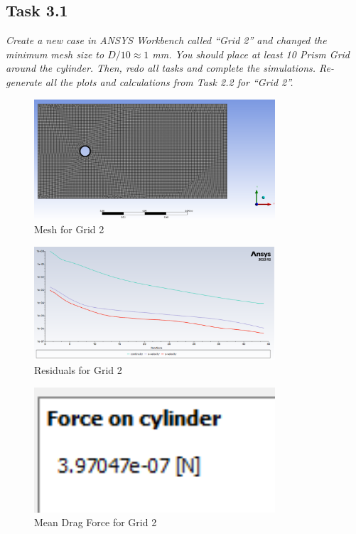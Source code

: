 \subsection*{Task 3.1}
\textit{Create a new case in ANSYS Workbench called “Grid 2” and changed the minimum mesh size to $D/10 \approx 1$ mm. You should place at least 10 Prism Grid around the cylinder. Then, redo all tasks and complete the simulations. Re-generate all the plots and calculations from Task 2.2 for “Grid 2”.}
\begin{figure}[H]
    \centering
    \includegraphics[width=0.8\textwidth]{Questions/Figures/mesh with grid 2.png}
    \caption{Mesh for Grid 2}
\end{figure}
\begin{figure}[H]
    \centering
    \includegraphics[width=0.8\textwidth]{Questions/Figures/residuals grid 2.png}
    \caption{Residuals for Grid 2}
\end{figure}
\begin{figure}[H]
    \centering
    \includegraphics[width=0.8\textwidth]{Questions/Figures/force on cylinder grid 2.png}
    \caption{Mean Drag Force for Grid 2}
\end{figure}
